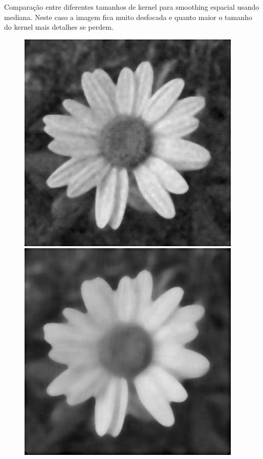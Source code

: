 \documentclass[a4paper]{report}
\begin{document}
Comparação entre diferentes tamanhos de kernel para smoothing espacial usando mediana. Neste caso a imagem
fica muito desfocada e quanto maior o tamanho do kernel mais detalhes se perdem.
\begin{figure}[H]
\centering
\begin{minipage}{.3\textwidth}
  \centering
    \includegraphics[width=0.95\textwidth]{images/Smooth/spatial-gaussian/flower_smooth_spatial_median_5_1.png}
\end{minipage}%
\begin{minipage}{.3\textwidth}
  \centering
    \includegraphics[width=0.95\textwidth]{images/Smooth/spatial-gaussian/flower_smooth_spatial_median_10_1.png}

\end{minipage}
\end{figure}
\end{document}
